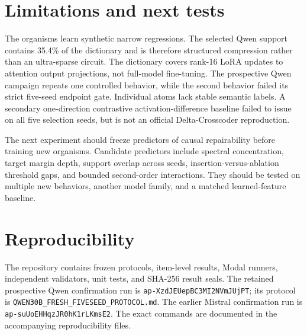 \documentclass[10pt,twocolumn]{article}
\begin{document}
\section{Limitations and next tests}

The organisms learn synthetic narrow regressions. The selected Qwen support contains 35.4\% of the dictionary and is therefore structured compression rather than an ultra-sparse circuit. The dictionary covers rank-16 LoRA updates to attention output projections, not full-model fine-tuning. The prospective Qwen campaign repeats one controlled behavior, while the second behavior failed its strict five-seed endpoint gate. Individual atoms lack stable semantic labels. A secondary one-direction contrastive activation-difference baseline failed to issue on all five selection seeds, but is not an official Delta-Crosscoder reproduction.

The next experiment should freeze predictors of causal repairability before training new organisms. Candidate predictors include spectral concentration, target margin depth, support overlap across seeds, insertion-versus-ablation threshold gaps, and bounded second-order interactions. They should be tested on multiple new behaviors, another model family, and a matched learned-feature baseline.

\section{Reproducibility}

The repository contains frozen protocols, item-level results, Modal runners, independent validators, unit tests, and SHA-256 result seals. The retained prospective Qwen confirmation run is \texttt{ap-XzdJEUepBC3MI2NVmJUjPT}; its protocol is \texttt{QWEN30B\_FRESH\_FIVESEED\_PROTOCOL.md}. The earlier Mistral confirmation run is \texttt{ap-suUoEHHqzJR0hK1rLKmsE2}. The exact commands are documented in the accompanying reproducibility files.



\end{document}
